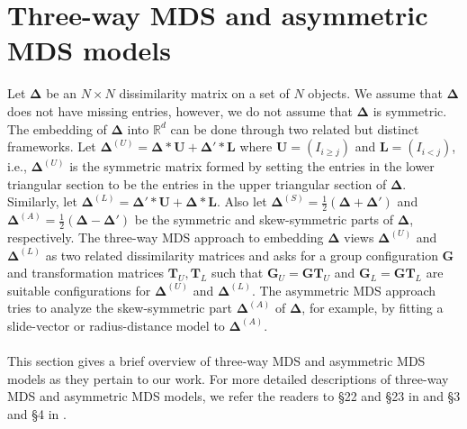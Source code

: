 \section{Three-way MDS and asymmetric MDS models}
\label{sec:three-way-mds}
Let $\bm{\Delta}$ be an $N \times N$ dissimilarity matrix on a set of
$N$ objects. We assume that $\bm{\Delta}$ does not have missing
entries, however, we do not assume that $\bm{\Delta}$ is
symmetric. The embedding of $\bm{\Delta}$ into $\mathbb{R}^{d}$ can be
done through two related but distinct frameworks. Let
$\bm{\Delta}^{(U)} = \bm{\Delta} \ast \mathbf{U} + \bm{\Delta}' \ast
\mathbf{L}$ where $\mathbf{U} = (I_{i \geq j})$ and $\mathbf{L} =
(I_{i < j})$, i.e., $\bm{\Delta}^{(U)}$ is the symmetric matrix formed
by setting the entries in the lower triangular section to be the
entries in the upper triangular section of $\bm{\Delta}$. Similarly,
let $\bm{\Delta}^{(L)} = \bm{\Delta}' \ast \mathbf{U} + \bm{\Delta}
\ast \mathbf{L}$. Also let $\bm{\Delta}^{(S)} =
\tfrac{1}{2}(\bm{\Delta} + \bm{\Delta}')$ and $\bm{\Delta}^{(A)} =
\tfrac{1}{2}(\bm{\Delta} - \bm{\Delta}')$ be the symmetric and
skew-symmetric parts of $\bm{\Delta}$, respectively. The three-way MDS
approach to embedding $\bm{\Delta}$ views $\bm{\Delta}^{(U)}$ and
$\bm{\Delta}^{(L)}$ as two related dissimilarity matrices and asks
for a group configuration $\mathbf{G}$ and transformation matrices
$\mathbf{T}_{U}, \mathbf{T}_L$ such that $\mathbf{G}_U = \mathbf{G}
\mathbf{T}_U$ and $\mathbf{G}_L = \mathbf{G} \mathbf{T}_L$ are
suitable configurations for $\bm{\Delta}^{(U)}$ and
$\bm{\Delta}^{(L)}$. The asymmetric MDS approach tries to analyze the
skew-symmetric part $\bm{\Delta}^{(A)}$ of $\bm{\Delta}$, for example,
by fitting a slide-vector or radius-distance model to
$\bm{\Delta}^{(A)}$. \\ \\
%
%
\noindent
This section gives a brief overview of three-way MDS and asymmetric
MDS models as they pertain to our work. For more detailed descriptions of
three-way MDS and asymmetric MDS models, we refer the readers to \S 22
and \S 23 in \citet{borg05:_moder} and \S 3 and \S 4 in
\citet{saito05:_data_analy_asymm_struc}.
%
%
